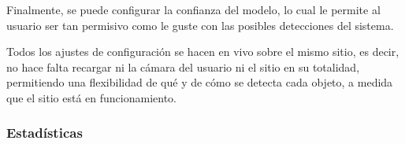 \documentclass[a4paper]{article}
\begin{document}
Finalmente, se puede configurar la confianza del modelo, lo cual le permite al usuario ser tan permisivo como le guste con las posibles detecciones del sistema.

\begin{figure}[H]
\end{figure}

Todos los ajustes de configuración se hacen en vivo sobre el mismo sitio, es decir, no hace falta recargar ni la cámara del usuario ni el sitio en su totalidad, permitiendo una flexibilidad de qué y de cómo se detecta cada objeto, a medida que el sitio está en funcionamiento.

\subsubsection{Estadísticas}
\end{document}
